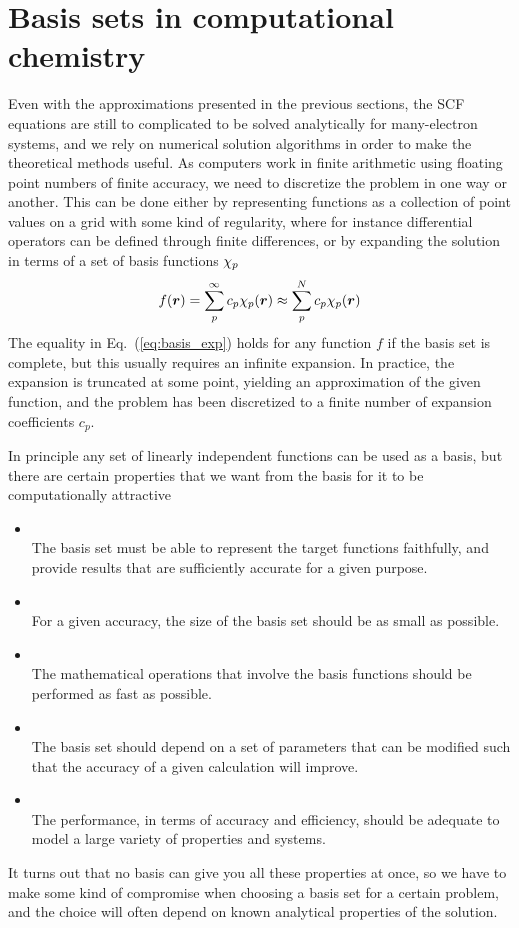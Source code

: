 \section{Basis sets in computational chemistry}
Even with the approximations presented in the previous sections, the SCF equations are still
to complicated to be solved analytically for many-electron systems, and we rely on numerical
solution algorithms in order to make the theoretical methods useful. As computers work in finite
arithmetic using floating point numbers of finite accuracy, we need to discretize the problem 
in one way or another. This can be done either by representing functions as a collection of
point values on a grid with some kind of regularity, where for instance differential operators
can be defined through finite differences, or by expanding the solution in terms of a set of 
basis functions $\chi_p$
\begin{equation}
    \label{eq:basis_exp}
    f(\boldsymbol r) = \sum_p^\infty c_p \chi_p(\boldsymbol r) \approx \sum_p^N c_p \chi_p(\boldsymbol r)
\end{equation}
The equality in Eq.~(\ref{eq:basis_exp}) holds for any function $f$ if the basis set is complete,
but this usually requires an infinite expansion. In practice, the expansion is truncated at some 
point, yielding an approximation of the given function, and the problem has been discretized to 
a finite number of expansion coefficients $c_p$. 

In principle any set of linearly independent functions can be used as a basis, but there are
certain properties that we want from the basis for it to be computationally 
attractive\cite{Losilla_thesis:2013}
\begin{itemize}
    \item {}\\
	The basis set must be able to represent the target functions faithfully, and provide
	results that are sufficiently accurate for a given purpose.
    \item {}\\
	For a given accuracy, the size of the basis set should be as small as possible.
    \item {}\\
	The mathematical operations that involve the basis functions should be performed as 
	fast as possible.
    \item {}\\
	The basis set should depend on a set of parameters that can be modified such that the 
	accuracy of a given calculation will improve.
    \item {}\\
	The performance, in terms of accuracy and efficiency, should be adequate to model a large 
	variety of properties and systems.
\end{itemize}
It turns out that no basis can give you all these properties at once, so we have to make some 
kind of compromise when choosing a basis set for a certain problem, and the choice will often 
depend on known analytical properties of the solution. 

